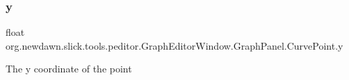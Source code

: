 \subsubsection{\texorpdfstring{y}{y}}
{\footnotesize\ttfamily float org.\+newdawn.\+slick.\+tools.\+peditor.\+Graph\+Editor\+Window.\+Graph\+Panel.\+Curve\+Point.\+y}

The y coordinate of the point 